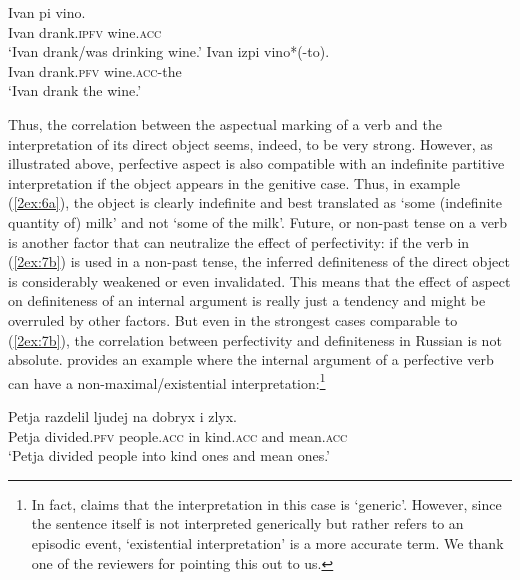 \documentclass[output=paper]{langsci/langscibook}
\begin{document}
\begin{exe}
\ex\label{2ex:8}
	\begin{xlista}
	\ex\label{2ex:8a}
	\gll	Ivan 	pi 			vino. \\
		Ivan 	drank.{\textsc{ipfv}} 	wine.{\textsc{acc}} 	\\
	\glt	`Ivan drank/was drinking wine.'
	\ex\label{2ex:8b}
	\gll 	Ivan 	izpi 			vino*(-to).\\
		Ivan 	drank.{\textsc{pfv}} 	wine.{\textsc{acc}}-the\\
	\glt	`Ivan drank the wine.'
	\end{xlista}
\end{exe}

Thus, the correlation between the aspectual marking of a verb and the interpretation of its direct object seems, indeed, to be very strong. However, as illustrated above, perfective aspect is also compatible with an indefinite partitive interpretation if the object appears in the genitive case. Thus, in example (\ref{2ex:6a}), the object is clearly indefinite and best translated as `some (indefinite quantity of) milk' and not `some of the milk'. Future, or non-past \citep[][]{borik:06} tense on a verb is another factor that can neutralize the effect of perfectivity:  if the verb in (\ref{2ex:7b}) is used in a non-past tense, the inferred definiteness of the direct object is considerably weakened or even invalidated. This means that the effect of aspect on definiteness of an internal argument is really just a tendency and might be overruled by other factors. But even in the strongest cases comparable to (\ref{2ex:7b}), the correlation between perfectivity  and definiteness in Russian is not absolute. \cite[][92]{borik:06} provides an example where the internal argument of a perfective verb can have a non-maximal/existential interpretation:\footnote{{In fact, \cite{borik:06}  claims that the interpretation in this case is `generic'. However, since the sentence itself is not interpreted generically but rather refers to an episodic event, `existential interpretation' is a more accurate term. We thank one of the reviewers for pointing this out to us.}}

\begin{exe}
\ex\label{2ex:9}
\gll	Petja 	razdelil 			ljudej 			na 	dobryx 		i 	zlyx. \\
	Petja 	divided.{\textsc{pfv}} 	people.{\textsc{acc}} 	in 	kind.{\textsc{acc}} 	and 	mean.{\textsc{acc}} \\
\glt	`Petja divided people into kind ones and mean ones.'
\end{exe}
\end{document}
